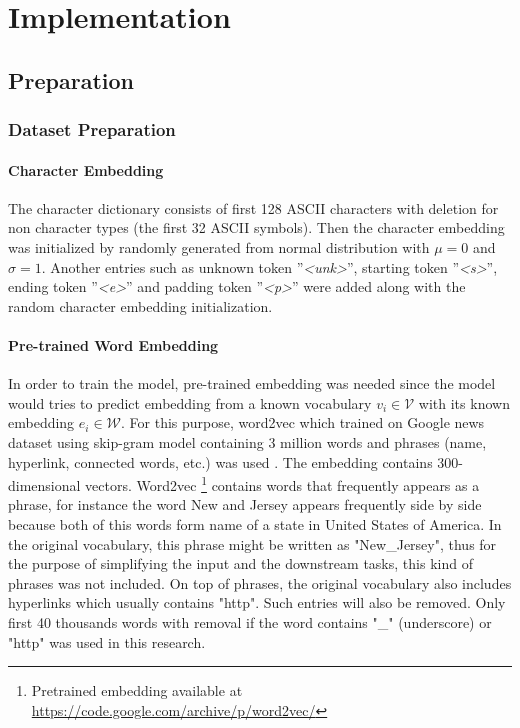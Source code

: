 \chapter{Implementation}
\label{chap:implementation}

\section{Preparation}
    \subsection{Dataset Preparation}
        \subsubsection{Character Embedding}
            The character dictionary consists of first 128 ASCII
            characters with deletion for non character types (the
            first 32 ASCII symbols). Then the character embedding was
            initialized by randomly generated from normal distribution
            with $\mu = 0$ and $\sigma = 1$. Another entries such as
            unknown token ''\textit{\textless unk\textgreater}'', starting
            token ''\textit{\textless s\textgreater}'', ending token
            ''\textit{\textless e\textgreater}'' and padding token
            ''\textit{\textless p\textgreater}'' were added along with the
            random character embedding initialization.

        \subsubsection{Pre-trained Word Embedding}
            In order to train the model, pre-trained embedding was
            needed since the model would tries to predict embedding
            from a known vocabulary $v_i \in \mathcal{V}$ with its known
            embedding $e_i \in \mathcal{W}$. For this purpose, word2vec
            which trained on Google news dataset using skip-gram model
            containing 3 million words and phrases (name, hyperlink,
            connected words, etc.) was used
            \citep{Distributed2013mikolov}. The embedding contains
            300-dimensional vectors. Word2vec \footnote{Pretrained
            embedding available at 
            \url{https://code.google.com/archive/p/word2vec/}}
            contains words that frequently appears as a phrase, for
            instance the word New and Jersey appears frequently side
            by side because both of this words form name of a state in
            United States of America. In the original vocabulary, this
            phrase might be written as "New\_Jersey", thus for the
            purpose of simplifying the input and the downstream tasks,
            this kind of phrases was not included. On top of phrases,
            the original vocabulary also includes hyperlinks which
            usually contains "http". Such entries will also be
            removed. Only first 40 thousands words with removal if the
            word contains "\_" (underscore) or "http" was used in this
            research.

